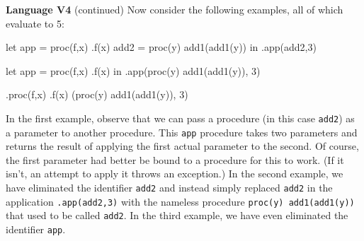 \begin{minipage}[t]{\sw}
\slidenumber
\LARGE
{\bf Language V4} (continued)\exx
Now consider the following examples, all of which evaluate to 5:
\large
\begin{qv}
let
  app = proc(f,x) .f(x)
  add2 = proc(y) add1(add1(y))
in
  .app(add2,3)

let
  app = proc(f,x) .f(x)
in
  .app(proc(y) add1(add1(y)), 3)

.proc(f,x) .f(x) (proc(y) add1(add1(y)), 3)
\end{qv}
\LARGE
In the first example,
observe that we can pass a procedure (in this case \verb'add2')
as a parameter to another procedure.
This \verb'app' procedure takes two parameters
and returns the result of applying the first actual parameter
to the second.
Of course, the first parameter had better be bound to a procedure
for this to work.
(If it isn't, an attempt to apply it throws an exception.)\exx
In the second example,
we have eliminated the identifier \verb'add2'
and instead simply replaced \verb'add2' in the application \verb'.app(add2,3)'
with the nameless procedure \verb'proc(y) add1(add1(y))'
that used to be called \verb'add2'.\exx
In the third example,
we have even eliminated the identifier \verb'app'.
\end{minipage}
